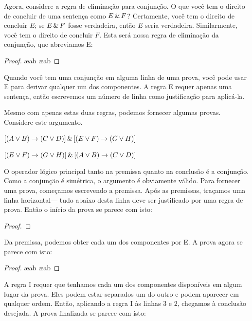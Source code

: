 Agora, considere a regra de eliminação para conjunção. O que você tem o direito de concluir de uma sentença como $E \,\&\, F$? Certamente, você tem o direito de concluir $E$; se $E \,\&\, F$ fosse verdadeira, então $E$ seria verdadeira. Similarmente, você tem o direito de concluir $F$. Esta será nossa regra de eliminação da conjunção, que abreviamos {\eand}E:

\begin{proof}
	 \ae{ab}
	 \ae{ab}
\end{proof}

Quando você tem uma conjunção em alguma linha de uma prova, você pode usar {\eand}E para derivar qualquer um dos componentes. A regra {\eand}E requer apenas uma sentença, então escrevemos um número de linha como justificação para aplicá-la.

Mesmo com apenas estas duas regras, podemos fornecer algumas provas. Considere este argumento.
\begin{earg}
\item[] $[(A\vee B)\rightarrow(C\vee D)] \,\&\, [(E \vee F) \rightarrow (G\vee H)]$
\item[\therefore] $[(E \vee F) \rightarrow (G\vee H)] \,\&\, [(A\vee B)\rightarrow(C\vee D)]$
\end{earg}
O operador lógico principal tanto na premissa quanto na conclusão é a conjunção. Como a conjunção é simétrica, o argumento é obviamente válido. Para fornecer uma prova, começamos escrevendo a premissa. Após as premissas, traçamos uma linha horizontal--- tudo abaixo desta linha deve ser justificado por uma regra de prova. Então o início da prova se parece com isto:

\begin{proof}
\end{proof}

Da premissa, podemos obter cada um dos componentes por {\eand}E. A prova agora se parece com isto:

\begin{proof}
	 \ae{ab}
	 \ae{ab}
\end{proof}

A regra {\eand}I requer que tenhamos cada um dos componentes disponíveis em algum lugar da prova. Eles podem estar separados um do outro e podem aparecer em qualquer ordem. Então, aplicando a regra {\eand}I às linhas 3 e 2, chegamos à conclusão desejada. A prova finalizada se parece com isto:

